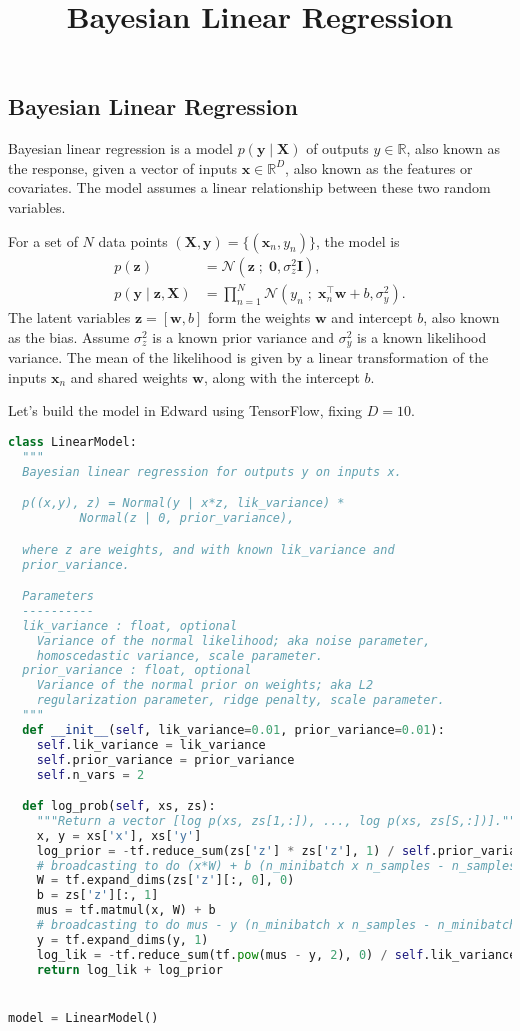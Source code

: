 \title{Bayesian Linear Regression}

\subsection{Bayesian Linear Regression}


Bayesian linear regression is a model $p(\mathbf{y}\mid \mathbf{X})$ of
outputs $y\in\mathbb{R}$, also known as the response, given
a vector of inputs
$\mathbf{x}\in\mathbb{R}^D$, also known as the features or covariates.
The model assumes a
linear relationship between these two random variables.

For a set of $N$ data points $(\mathbf{X},\mathbf{y})=\{(\mathbf{x}_n, y_n)\}$,
the model is
\begin{align*}
  p(\mathbf{z})
  &=
  \mathcal{N}(\mathbf{z} \;;\; \mathbf{0}, \sigma_z^2\mathbf{I}),
  \\
  p(\mathbf{y} \mid \mathbf{z}, \mathbf{X})
  &=
  \prod_{n=1}^N
  \mathcal{N}(y_n \;;\; \mathbf{x}_n^\top\mathbf{w} + b, \sigma_y^2).
\end{align*}
The latent variables $\mathbf{z}=[\mathbf{w},b]$ form the weights $\mathbf{w}$
and intercept $b$, also known as the bias.
Assume $\sigma_z^2$ is a known prior variance and $\sigma_y^2$ is a
known likelihood variance. The mean of the likelihood is given by a
linear transformation of the inputs $\mathbf{x}_n$ and shared weights
$\mathbf{w}$, along with the intercept $b$.

Let's build the model in Edward using TensorFlow, fixing $D=10$.
\begin{lstlisting}[language=Python]
class LinearModel:
  """
  Bayesian linear regression for outputs y on inputs x.

  p((x,y), z) = Normal(y | x*z, lik_variance) *
          Normal(z | 0, prior_variance),

  where z are weights, and with known lik_variance and
  prior_variance.

  Parameters
  ----------
  lik_variance : float, optional
    Variance of the normal likelihood; aka noise parameter,
    homoscedastic variance, scale parameter.
  prior_variance : float, optional
    Variance of the normal prior on weights; aka L2
    regularization parameter, ridge penalty, scale parameter.
  """
  def __init__(self, lik_variance=0.01, prior_variance=0.01):
    self.lik_variance = lik_variance
    self.prior_variance = prior_variance
    self.n_vars = 2

  def log_prob(self, xs, zs):
    """Return a vector [log p(xs, zs[1,:]), ..., log p(xs, zs[S,:])]."""
    x, y = xs['x'], xs['y']
    log_prior = -tf.reduce_sum(zs['z'] * zs['z'], 1) / self.prior_variance
    # broadcasting to do (x*W) + b (n_minibatch x n_samples - n_samples)
    W = tf.expand_dims(zs['z'][:, 0], 0)
    b = zs['z'][:, 1]
    mus = tf.matmul(x, W) + b
    # broadcasting to do mus - y (n_minibatch x n_samples - n_minibatch x 1)
    y = tf.expand_dims(y, 1)
    log_lik = -tf.reduce_sum(tf.pow(mus - y, 2), 0) / self.lik_variance
    return log_lik + log_prior


model = LinearModel()
\end{lstlisting}

